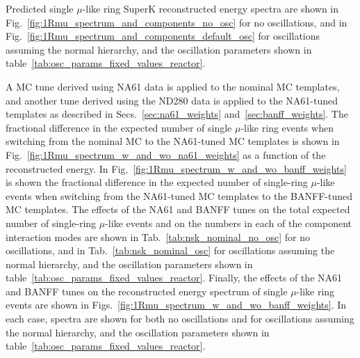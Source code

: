 
Predicted single $\mu$-like ring SuperK reconstructed energy spectra are shown in Fig.~\ref{fig:1Rmu_spectrum_and_components_no_osc} for no oscillations, 
and in Fig.~\ref{fig:1Rmu_spectrum_and_components_default_osc} for oscillations assuming the normal hierarchy, and the oscillation parameters shown in table~\ref{tab:osc_params_fixed_values_reactor}.

A MC tune derived using NA61 data is applied to the nominal MC templates, and another tune derived using the ND280 data is 
applied to the NA61-tuned templates as described in Secs.~\ref{sec:na61_weights} and~\ref{sec:banff_weights}.
The fractional difference in the expected number of single $\mu$-like ring events when switching from the nominal MC to the
NA61-tuned MC templates is shown in Fig.~\ref{fig:1Rmu_spectrum_w_and_wo_na61_weights} as a function of
the reconstructed energy.
In Fig.~\ref{fig:1Rmu_spectrum_w_and_wo_banff_weights} is shown the fractional difference in the expected number of
single-ring $\mu$-like events when switching from the NA61-tuned MC templates to the BANFF-tuned MC templates.
The effects of the NA61 and BANFF tunes on the total expected number of single-ring $\mu$-like events
and on the numbers in each of the \NMCTemplate{} component interaction modes are shown in
Tab.~\ref{tab:nsk_nominal_no_osc} for no oscillations, and in
Tab.~\ref{tab:nsk_nominal_osc} for oscillations assuming the normal hierarchy, and the oscillation parameters shown in table~\ref{tab:osc_params_fixed_values_reactor}.
Finally, the effects of the NA61 and BANFF tunes on the reconstructed energy spectrum of
single $\mu$-like ring events are shown in
Figs.~\ref{fig:1Rmu_spectrum_w_and_wo_banff_weights}.
In each case, spectra are shown for both no oscillations and for oscillations assuming the normal hierarchy, and the oscillation parameters shown in table~\ref{tab:osc_params_fixed_values_reactor}.



